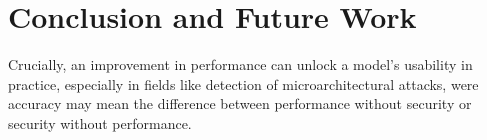 \section{Conclusion and Future Work}\label{future}

Crucially, an improvement in performance can unlock a model's usability in practice, especially in fields like detection of microarchitectural attacks, were accuracy may mean the difference between performance without security or security without performance. 